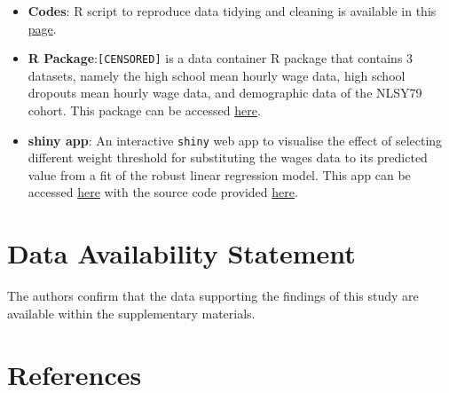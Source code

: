 \documentclass{article}
\begin{document}
\begin{itemize}
\item
  \textbf{Codes}: R script to reproduce data tidying and cleaning is available in this \href{CENSORED/articles/process-data.html}{page}.
\item
  \textbf{R Package}:\texttt{[CENSORED]} is a data container R package that contains 3 datasets, namely the high school mean hourly wage data, high school dropouts mean hourly wage data, and demographic data of the NLSY79 cohort. This package can be accessed \href{CENSORED}{here}.
\item
  \textbf{shiny app}: An interactive \texttt{shiny} web app to visualise the effect of selecting different weight threshold for substituting the wages data to its predicted value from a fit of the robust linear regression model. This app can be accessed \href{CENSORED}{here} with the source code provided \href{CENSORED/tree/master/app}{here}.
\end{itemize}

\hypertarget{data-availability-statement}{%
\section{Data Availability Statement}\label{data-availability-statement}}

The authors confirm that the data supporting the findings of this study are available within the supplementary materials.

\hypertarget{references}{%
\section*{References}\label{references}}
\end{document}
